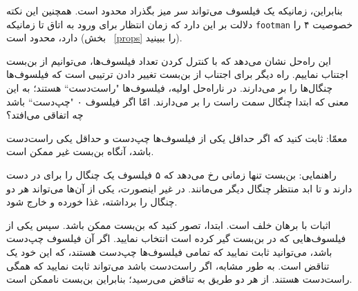 \documentclass{book}
\begin{document}
    بنابراین، زمانیکه یک فیلسوف می‌تواند سر میز بگذراد محدود است. همچنین این نکته دلالت بر این دارد که زمان انتظار برای ورود به اتاق 
    تا زمانیکه {\tt footman}  خصوصیت ۴ را دارد، محدود است (بخش ~\ref{props} را ببینید). 
     
    

    این راه‌حل نشان می‌دهد که با کنترل کردن تعداد فیلسوف‌ها، می‌توانیم از بن‌بست اجتناب نماییم. 
    راه دیگر برای اجتناب از بن‌بست تغییر دادن ترتیبی است  که فیلسوف‌ها چنگال‌ها را بر می‌دارند. 
    در ناراه‌حل اولیه، فیلسوف‌ها "راست‌دست``\LTRfootnote{} هستند؛ به این معنی که ابتدا چنگال سمت راست را بر می‌دارند. 
    امّا اگر فیلسوف ۰ "چپ‌دست``\LTRfootnote{} باشد چه اتفاقی می‌افتد؟‌

    معمّا: ثابت کنید که اگر حداقل یکی از فیلسوف‌ها چپ‌دست و حداقل یکی راست‌دست باشد، آنگاه بن‌بست غیر ممکن است. 

    راهنمایی: بن‌بست تنها زمانی رخ می‌دهد که ۵ فیلسوف یک چنگال را برای در دست دارند و تا ابد منتظر چنگال دیگر می‌مانند. 
    در غیر اینصورت، یکی از آن‌ها می‌تواند هر دو چنگال را برداشته، غذا خورده و خارج شود. 

    اثبات با برهان خلف است.  ابتدا، تصور کنید که بن‌بست ممکن باشد. 
    سپس یکی از فیلسوف‌هایی که در بن‌بست گیر کرده است انتخاب نمایید. 
    اگر آن فیلسوف چپ‌دست باشد،‌ می‌توانید ثابت نمایید که تمامی‌ فیلسوف‌ها چپ‌دست هستند، که این خود یک تناقض است. 
    به طور مشابه، اگر راست‌دست باشد می‌تواند ثابت نمایید که همگی راست‌دست هستند. از هر دو طریق به تناقض می‌رسید؛ بنابراین 
    بن‌بست ناممکن است. 
    
\end{document}
